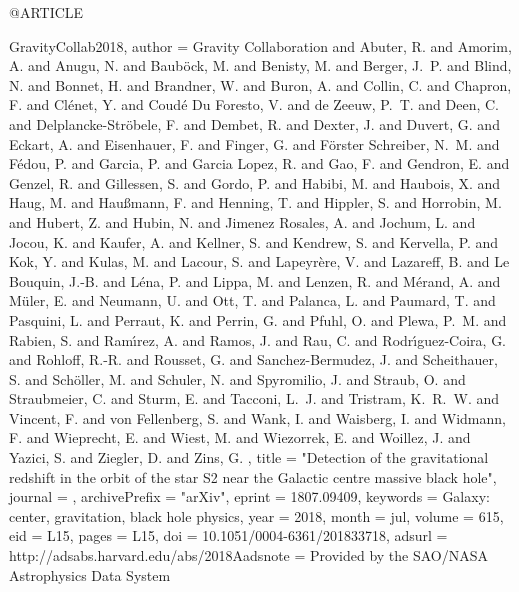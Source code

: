 \documentclass[apj]{emulateapj}
\begin{document}
@ARTICLE{GravityCollab2018,
   author = {{Gravity Collaboration} and {Abuter}, R. and {Amorim}, A. and 
	{Anugu}, N. and {Baub{\"o}ck}, M. and {Benisty}, M. and {Berger}, J.~P. and 
	{Blind}, N. and {Bonnet}, H. and {Brandner}, W. and {Buron}, A. and 
	{Collin}, C. and {Chapron}, F. and {Cl{\'e}net}, Y. and {Coud{\'e} Du Foresto}, V. and 
	{de Zeeuw}, P.~T. and {Deen}, C. and {Delplancke-Str{\"o}bele}, F. and 
	{Dembet}, R. and {Dexter}, J. and {Duvert}, G. and {Eckart}, A. and 
	{Eisenhauer}, F. and {Finger}, G. and {F{\"o}rster Schreiber}, N.~M. and 
	{F{\'e}dou}, P. and {Garcia}, P. and {Garcia Lopez}, R. and 
	{Gao}, F. and {Gendron}, E. and {Genzel}, R. and {Gillessen}, S. and 
	{Gordo}, P. and {Habibi}, M. and {Haubois}, X. and {Haug}, M. and 
	{Hau{\ss}mann}, F. and {Henning}, T. and {Hippler}, S. and {Horrobin}, M. and 
	{Hubert}, Z. and {Hubin}, N. and {Jimenez Rosales}, A. and {Jochum}, L. and 
	{Jocou}, K. and {Kaufer}, A. and {Kellner}, S. and {Kendrew}, S. and 
	{Kervella}, P. and {Kok}, Y. and {Kulas}, M. and {Lacour}, S. and 
	{Lapeyr{\`e}re}, V. and {Lazareff}, B. and {Le Bouquin}, J.-B. and 
	{L{\'e}na}, P. and {Lippa}, M. and {Lenzen}, R. and {M{\'e}rand}, A. and 
	{M{\"u}ler}, E. and {Neumann}, U. and {Ott}, T. and {Palanca}, L. and 
	{Paumard}, T. and {Pasquini}, L. and {Perraut}, K. and {Perrin}, G. and 
	{Pfuhl}, O. and {Plewa}, P.~M. and {Rabien}, S. and {Ram{\'{\i}}rez}, A. and 
	{Ramos}, J. and {Rau}, C. and {Rodr{\'{\i}}guez-Coira}, G. and 
	{Rohloff}, R.-R. and {Rousset}, G. and {Sanchez-Bermudez}, J. and 
	{Scheithauer}, S. and {Sch{\"o}ller}, M. and {Schuler}, N. and 
	{Spyromilio}, J. and {Straub}, O. and {Straubmeier}, C. and 
	{Sturm}, E. and {Tacconi}, L.~J. and {Tristram}, K.~R.~W. and 
	{Vincent}, F. and {von Fellenberg}, S. and {Wank}, I. and {Waisberg}, I. and 
	{Widmann}, F. and {Wieprecht}, E. and {Wiest}, M. and {Wiezorrek}, E. and 
	{Woillez}, J. and {Yazici}, S. and {Ziegler}, D. and {Zins}, G.
	},
    title = "{Detection of the gravitational redshift in the orbit of the star S2 near the Galactic centre massive black hole}",
  journal = {\aap},
archivePrefix = "arXiv",
   eprint = {1807.09409},
 keywords = {Galaxy: center, gravitation, black hole physics},
     year = 2018,
    month = jul,
   volume = 615,
      eid = {L15},
    pages = {L15},
      doi = {10.1051/0004-6361/201833718},
   adsurl = {http://adsabs.harvard.edu/abs/2018Aadsnote = {Provided by the SAO/NASA Astrophysics Data System}
}


}
\end{document}
